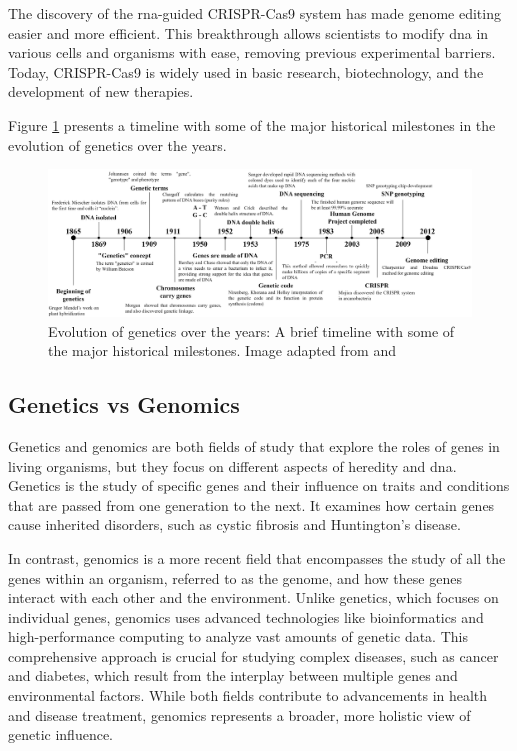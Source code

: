 The discovery of the \ac{rna}-guided CRISPR-Cas9 system has made genome editing easier and more efficient. This breakthrough allows scientists to modify \ac{dna} in various cells and organisms with ease, removing previous experimental barriers. Today, CRISPR-Cas9 is widely used in basic research, biotechnology, and the development of new therapies. \cite{CRISPR-CAS9}

Figure \ref{fig:timeline} presents a timeline with some of the major historical milestones in the evolution of genetics over the years.

\begin{figure}[H]
    \centering
    \includegraphics[width=1\textwidth]{figs/timeline.png}
    \caption{Evolution of genetics over the years: A brief timeline with some of the major historical milestones. Image adapted from \cite{genetictimeline} and \cite{genetictimeline2}}
    \label{fig:timeline}
\end{figure}

\subsection{Genetics vs Genomics} \label{subsec:genetics_genomics}

Genetics and genomics are both fields of study that explore the roles of genes in living organisms, but they focus on different aspects of heredity and \ac{dna}. Genetics is the study of specific genes and their influence on traits and conditions that are passed from one generation to the next. It examines how certain genes cause inherited disorders, such as cystic fibrosis and Huntington's disease. \cite{NHGRI2018}

In contrast, genomics is a more recent field that encompasses the study of all the genes within an organism, referred to as the genome, and how these genes interact with each other and the environment. Unlike genetics, which focuses on individual genes, genomics uses advanced technologies like bioinformatics and high-performance computing to analyze vast amounts of genetic data. This comprehensive approach is crucial for studying complex diseases, such as cancer and diabetes, which result from the interplay between multiple genes and environmental factors. While both fields contribute to advancements in health and disease treatment, genomics represents a broader, more holistic view of genetic influence. \cite{JAX2017}


